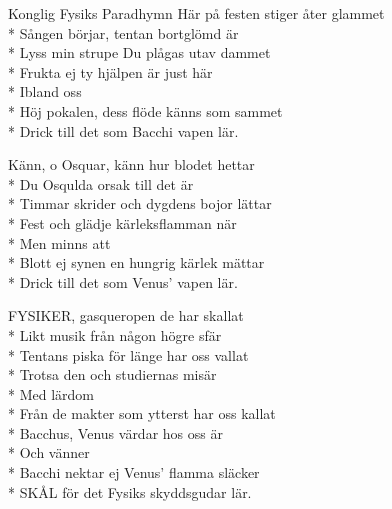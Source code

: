 \documentclass[a4paper, twoside, titlepage]{blad}
\begin{document}
\begin{sang}{Konglig Fysiks Paradhymn}
Här på festen stiger åter glammet\\*
Sången börjar, tentan bortglömd är\\*
Lyss min strupe Du plågas utav dammet\\*
Frukta ej ty hjälpen är just här\\*
Ibland oss\\*
Höj pokalen, dess flöde känns som sammet\\*
Drick till det som Bacchi vapen lär.

Känn, o Osquar, känn hur blodet hettar\\*
Du Osqulda orsak till det är\\*
Timmar skrider och dygdens bojor lättar\\*
Fest och glädje kärleksflamman när\\*
Men minns att\\*
Blott ej synen en hungrig kärlek mättar\\*
Drick till det som Venus' vapen lär.

FYSIKER, gasqueropen de har skallat\\*
Likt musik från någon högre sfär\\*
Tentans piska för länge har oss vallat\\*
Trotsa den och studiernas misär\\*
Med lärdom\\*
Från de makter som ytterst har oss kallat\\*
Bacchus, Venus värdar hos oss är\\*
Och vänner\\*
Bacchi nektar ej Venus' flamma släcker\\*
SKÅL för det Fysiks skyddsgudar lär.
\end{sang}
\end{document}
